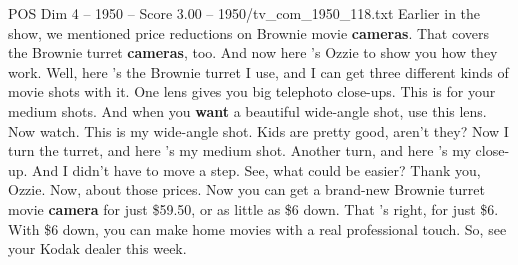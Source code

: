 \begin{textsample}{POS Dim 4 – 1950 – Score 3.00 – 1950/tv\_com\_1950\_118.txt}  \label{ex:f4_pos_084}
Earlier in the show, we mentioned price reductions on Brownie movie \textbf{cameras}.
That covers the Brownie turret \textbf{cameras}, too.
And now here 's Ozzie to show you how they work.
Well, here 's the Brownie turret I use, and I can get three different kinds of movie shots with it.
One lens gives you big telephoto close-ups.
This is for your medium shots.
And when you \textbf{want} a beautiful wide-angle shot, use this lens.
Now watch.
This is my wide-angle shot.
Kids are pretty good, aren't they?
Now I turn the turret, and here 's my medium shot.
Another turn, and here 's my close-up.
And I didn't have to move a step.
See, what could be easier?
Thank you, Ozzie.
Now, about those prices.
Now you can get a brand-new Brownie turret movie \textbf{camera} for just \$59.50, or as little as \$6 down.
That 's right, for just \$6.
With \$6 down, you can make home movies with a real professional touch.
So, see your Kodak dealer this week.

\end{textsample}
